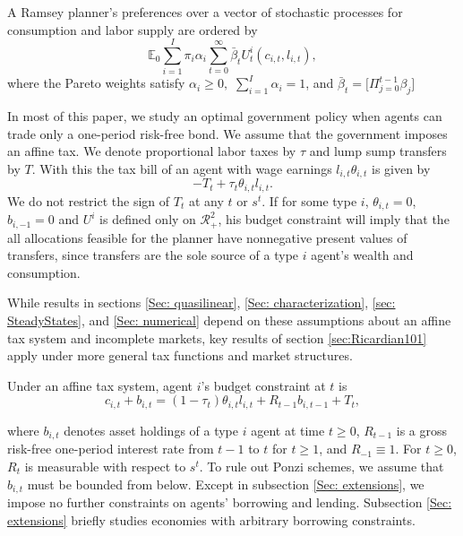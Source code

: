 \documentclass[thmsb,11pt]{article}
\begin{document}
A Ramsey  planner's preferences over a vector of stochastic processes for consumption and
labor supply  are ordered by
\begin{equation}
\mathbb{E}_{0}\sum_{i=1}^{I}\pi _{i}\alpha _{i}\sum_{t=0}^{\infty }\bar{\beta}_t U_{t}^{i}\left( c_{i,t},l_{i,t}\right),  \label{govmt objective}
\end{equation}
where the Pareto weights satisfy $\alpha _{i}\geq 0,$ $\sum_{i=1}^{I}\alpha _{i}=1$, and $\bar{\beta}_t=\bigl[\Pi_{j=0}^{t-1} \beta_j\bigr]$

In most of this paper, we study an optimal  government policy when agents can   trade
only a one-period risk-free bond.  We assume that the government  imposes an
affine tax. We denote proportional labor taxes by $\tau$ and lump sump transfers by $T$. With this the tax bill of an agent with wage earnings $l_{i,t}\theta_{i,t}$ is given by
\begin{equation*}
- T_t + \tau_t \theta_{i,t}l_{i,t}. \end{equation*}
We do not restrict the sign of $T_{t}$ at any $t$ or $s^t$. %
If for some type $i$, $\theta _{i,t}=0$, $b_{i, -1} = 0$ and $U^i$ is defined only on $\mathcal{R}^2_{+}$, his budget constraint will imply that the all allocations feasible for the planner have nonnegative present values of
transfers, since transfers are the sole source of a type $i$ agent's wealth and consumption.

While results in sections \ref{Sec: quasilinear}, \ref{Sec: characterization}, \ref{sec: SteadyStates}, and  \ref{Sec: numerical}  depend on these  assumptions about an affine tax system and incomplete markets,
  key results of  section  \ref{sec:Ricardian101} apply under  more general tax functions and
market structures.

Under an affine tax system, agent $i$'s budget constraint at $t$ is%
\begin{equation}
c_{i,t}+b_{i,t}=\left( 1-\tau _{t}\right) \theta
_{i,t}l_{i,t}+R_{t-1}b_{i,t-1}+T_{t},  \label{agent bc affine}
\end{equation}

\noindent where $b_{i,t}$ denotes asset holdings of a type $i$ agent  at time $t\geq 0$, $%
R_{t-1}$ is a gross risk-free one-period interest rate from  $t-1$ to
 $t$ for $t\geq 1$, and $R_{-1}\equiv 1$. For $t\geq 0$, $R_{t}$ is
measurable with respect to $s^t$. To rule out Ponzi schemes,
we assume that $b_{i,t}$ must be bounded from below. Except in subsection \ref{Sec: extensions}, we
impose no further constraints on agents'  borrowing  and lending. Subsection \ref{Sec: extensions} briefly studies economies with
arbitrary borrowing constraints.
\end{document}
